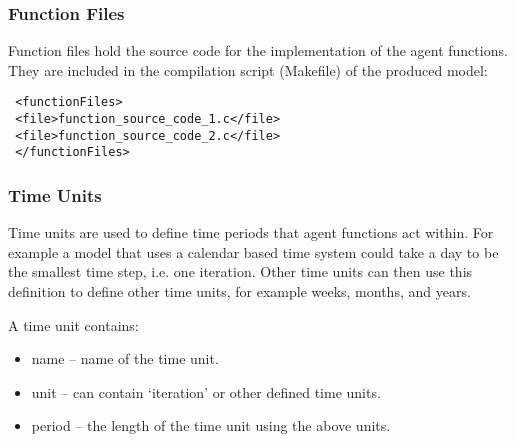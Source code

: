% 
% 
% 

\subsubsection{Function Files}

Function files hold the source code for the implementation of the
agent functions.
They are included in the compilation script (Makefile) of the produced model:

\begin{mylisting}
\begin{verbatim}
 <functionFiles>
 <file>function_source_code_1.c</file>
 <file>function_source_code_2.c</file>
 </functionFiles>
\end{verbatim}
\end{mylisting}

\subsubsection{Time Units}
\label{timeunit}


Time units are used to define time periods that agent functions act within. For
example a model that uses a calendar based time system could take a day to be
the smallest time step, i.e. one iteration. Other time units can then use this
definition to define other time units, for example weeks, months, and years.

A time unit contains:

\begin{itemize}
\item name -- name of the time unit.
\item unit -- can contain `iteration' or other defined time units.
\item period -- the length of the time unit using the above units.
\end{itemize}

